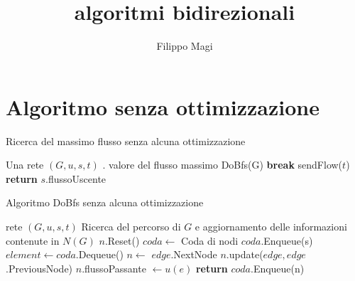 \documentclass{article}
\title{algoritmi bidirezionali}
\author{Filippo Magi }
\begin{document}
\maketitle
\section{Algoritmo senza ottimizzazione}

\begin{algorithm}
\caption{Ricerca del massimo flusso senza alcuna ottimizzazione}
\begin{algorithmic}
\REQUIRE Una rete  $(G,u,s,t)$ .
\ENSURE valore del flusso massimo 
\STATE DoBfs(G)
\STATE \textbf{break}
\ENDIF
\STATE sendFlow($t$)
\ENDWHILE
\STATE \textbf{return} $s.$flussoUscente

\end{algorithmic}
\end{algorithm}

\begin{algorithm}
\caption{Algoritmo DoBfs senza alcuna ottimizzazione}
\begin{algorithmic}
\REQUIRE rete $(G,u,s,t)$
\ENSURE Ricerca del percorso di $G$ e aggiornamento delle informazioni contenute in $N(G)$
\STATE $n$.Reset()
\ENDFOR
\STATE $coda \leftarrow$ Coda di nodi
\STATE $coda$.Enqueue(s)
\STATE $element \leftarrow coda$.Dequeue()
\STATE $n \leftarrow$ $edge$.NextNode
\STATE $n$.update($edge,edge$.PreviousNode)
\STATE$n.$flussoPassante $\leftarrow u(e)$
\STATE \textbf{return}
\ELSE
\STATE $coda$.Enqueue(n)
\ENDIF
\ENDIF
\ENDFOR
\ENDWHILE
\end{algorithmic}
\end{algorithm}
\end{document}
